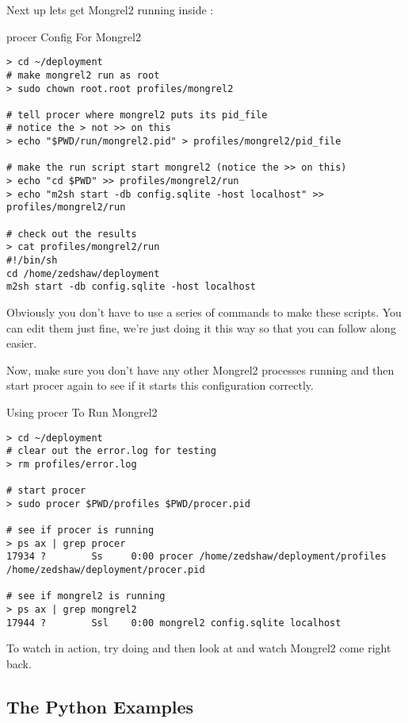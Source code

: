 Next up lets get Mongrel2 running inside :

\begin{code}{procer Config For Mongrel2}
\begin{Verbatim}
> cd ~/deployment
# make mongrel2 run as root
> sudo chown root.root profiles/mongrel2

# tell procer where mongrel2 puts its pid_file
# notice the > not >> on this
> echo "$PWD/run/mongrel2.pid" > profiles/mongrel2/pid_file

# make the run script start mongrel2 (notice the >> on this)
> echo "cd $PWD" >> profiles/mongrel2/run
> echo "m2sh start -db config.sqlite -host localhost" >> profiles/mongrel2/run

# check out the results
> cat profiles/mongrel2/run
#!/bin/sh
cd /home/zedshaw/deployment
m2sh start -db config.sqlite -host localhost
\end{Verbatim}
\end{code}

Obviously you don't have to use a series of  commands to
make these scripts.  You can edit them just fine, we're just doing it
this way so that you can follow along easier.

Now, make sure you don't have any other Mongrel2 processes running
and then start procer again to see if it starts this configuration
correctly.


\begin{code}{Using procer To Run Mongrel2}
\begin{Verbatim}
> cd ~/deployment
# clear out the error.log for testing
> rm profiles/error.log 

# start procer 
> sudo procer $PWD/profiles $PWD/procer.pid

# see if procer is running
> ps ax | grep procer
17934 ?        Ss     0:00 procer /home/zedshaw/deployment/profiles /home/zedshaw/deployment/procer.pid

# see if mongrel2 is running
> ps ax | grep mongrel2
17944 ?        Ssl    0:00 mongrel2 config.sqlite localhost

\end{Verbatim}
\end{code}

To watch  in action, try doing  and then look at  and watch
Mongrel2 come right back.


\subsection{The Python Examples}

